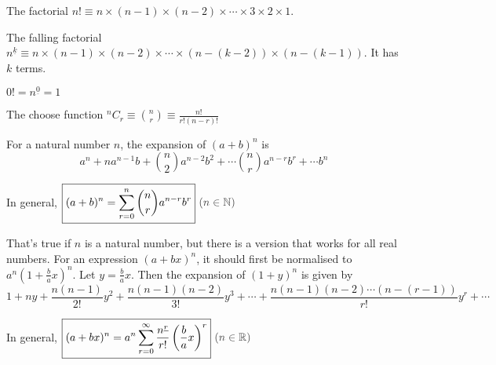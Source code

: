\documentclass[../main.tex]{subfile}
\begin{document}


\vspace{-0.8em}
\begin{center}
The factorial $n! \equiv n \times (n - 1) \times (n - 2) \times \cdots \times 3 \times 2 \times 1$.

The falling factorial $n^{\underline{k}} \equiv n \times (n - 1) \times (n - 2) \times \cdots \times (n - (k - 2)) \times (n - (k - 1))$. It has $k$ terms.

$\boxed{0! = n^{\underline{0}} = 1}$

The choose function $\displaystyle ^n C_r \equiv \boxed{\binom{n}{r} \equiv \frac{n!}{r! (n - r)!}}$
\end{center}


\vspace{-0.8em}
\begin{center}
For a natural number $n$, the expansion of $(a + b)^n$ is $$a^n + n a^{n - 1} b + \binom{n}{2} a^{n - 2} b^2 + \cdots \binom{n}{r} a^{n - r} b^r + \cdots b^n$$

In general, $\boxed{\displaystyle (a + b)^n = \sum_{r = 0}^n \binom{n}{r} a^{n - r} b^r}\ \constraint{n \in \mathbb{N}}$

That's true if $n$ is a natural number, but there is a version that works for all real numbers. For an expression $(a + bx)^n$, it should first be normalised to $a^n (1 + \frac{b}{a} x)^n$. Let $y = \frac{b}{a} x$. Then the expansion of $(1 + y)^n$ is given by $$1 + ny + \frac{n (n - 1)}{2!} y^2 + \frac{n (n - 1) (n - 2)}{3!} y^3 + \cdots + \frac{n (n - 1) (n - 2) \cdots (n - (r - 1))}{r!} y^r + \cdots$$

In general, $\boxed{\displaystyle (a + bx)^n = a^n \sum_{r = 0}^\infty \frac{n^{\underline{r}}}{r!} \left(\frac{b}{a} x\right)^r}\ \constraint{n \in \mathbb{R}}$
\end{center}
\end{document}
